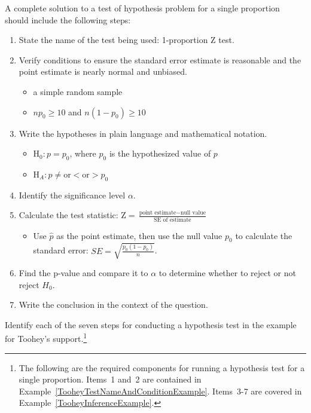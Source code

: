 \begin{termBox}{
A complete solution to a test of hypothesis problem for a single proportion should include the following steps:
\begin{enumerate}
\setlength{\itemsep}{0mm}
\item State the name of the test being used: 1-proportion Z test.
\item Verify conditions to ensure the standard error estimate is reasonable and the point estimate is nearly normal and unbiased.\vspace{-1.5mm}
  \begin{itemize}
  \setlength{\itemsep}{0mm}
  \item a simple random sample
  \item $np_0\geq10$ and $n(1-p_0)\geq10$
  \end{itemize}
\item Write the hypotheses in plain language and mathematical notation.\vspace{-1.5mm}
  \begin{itemize}
  \setlength{\itemsep}{0mm}
  \item H$_0: p = p_0$, where $p_0$ is the hypothesized value of $p$
  \item H$_A: p \ne \text{or} < \text{or} > p_0$
  \end{itemize}
\item Identify the significance level $\alpha$.
\vspace{-1.5mm}
\item Calculate the test statistic: $\text{Z} = \frac{\text{point estimate} - \text{null value}}{\text{SE of estimate}}$
  \begin{itemize}
  \item Use $\hat{p}$ as the point estimate, then use the null value $p_0$ to calculate the standard error: $SE = \sqrt{\frac{p_0(1-p_0)}{n}}$.
  \end{itemize}
\item Find the p-value and compare it to $\alpha$ to determine whether to reject or not reject $H_0$.
\item Write the conclusion in the context of the question.
\end{enumerate}}
\end{termBox}

\begin{exercise}
Identify each of the seven steps for conducting a hypothesis test in the example for Toohey's support.\footnote{The following are the required components for running a hypothesis test for a single proportion. Items~1 and~2 are contained in Example~\ref{TooheyTestNameAndConditionExample}. Items~3-7 are covered in Example~\ref{TooheyInferenceExample}.}
\end{exercise}

